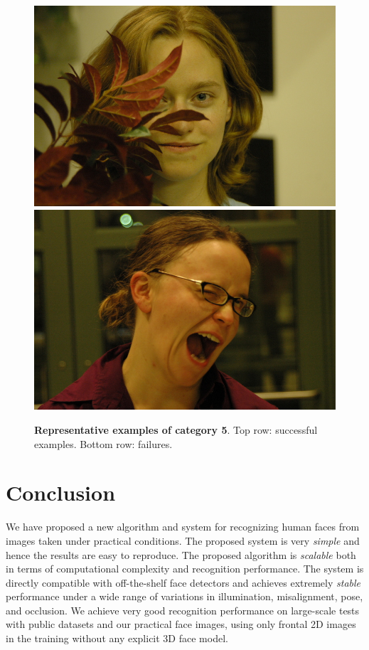 \begin{figure}
\includegraphics[scale=0.35,clip=true]{figures_cvpr/examples/5/failure/DSC_1917.JPG} 
\includegraphics[scale=0.35,clip=true]{figures_cvpr/examples/5/failure/DSC_2008.JPG} 
 \caption{{\bf Representative examples of category 5}. Top row: successful examples. Bottom row: failures.\vspace{0mm}}\label{fig:examples5}
\end{figure}

\vspace{0mm}
\section{Conclusion}\vspace{0mm}
We have proposed a new algorithm and system for recognizing human faces from images taken under practical conditions. The proposed system is very {\em simple} and hence the results are easy to reproduce. The proposed algorithm is {\em scalable} both in terms of computational complexity and recognition performance. The system is directly compatible with off-the-shelf face detectors and achieves extremely {\em stable} performance under a wide range of variations in illumination, misalignment, pose, and occlusion. We achieve very good recognition performance on large-scale tests with public datasets and our practical face images, using only frontal 2D images in the training without any explicit 3D face model. 

%
%
%

%

